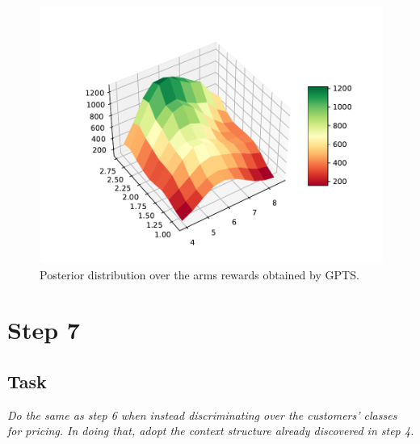 \documentclass[12pt,a4paper]{report}
\begin{document}
\begin{figure}[H]
\centering
  \includegraphics[scale = 0.7, center]{6arms}
  \caption{Posterior distribution over the arms rewards obtained by GPTS.}
\end{figure}
		\section{Step 7}
			\subsection{Task}
\textit{Do the same as step 6 when instead discriminating over the customers’ classes for pricing. In doing that, adopt the context structure already discovered in step 4.}
\end{document}
